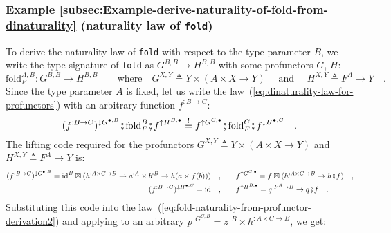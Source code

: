 \subsubsection{Example \label{subsec:Example-derive-naturality-of-fold-from-dinaturality}\ref{subsec:Example-derive-naturality-of-fold-from-dinaturality}
(naturality law of \lstinline!fold!)}

To derive the naturality law of \lstinline!fold! with respect to
the type parameter $B$, we write the type signature of \lstinline!fold!
as $G^{B,B}\rightarrow H^{B,B}$ with some profunctors $G$, $H$:
\[
\text{fold}_{F}^{A,B}:G^{B,B}\rightarrow H^{B,B}\quad\quad\text{where}\quad G^{X,Y}\triangleq Y\times(A\times X\rightarrow Y)\quad\text{ and }\quad H^{X,Y}\triangleq F^{A}\rightarrow Y\quad.
\]
Since the type parameter $A$ is fixed, let us write the law~(\ref{eq:dinaturality-law-for-profunctors})
with an arbitrary function $f^{:B\rightarrow C}$:
\begin{equation}
(f^{:B\rightarrow C})^{\downarrow G^{\bullet,B}}\bef\text{fold}_{F}^{B}\bef f^{\uparrow H^{B,\bullet}}\overset{!}{=}f^{\uparrow G^{C,\bullet}}\bef\text{fold}_{F}^{C}\bef f^{\downarrow H^{\bullet,C}}\quad.\label{eq:fold-naturality-from-profunctor-derivation2}
\end{equation}
The lifting code required for the profunctors $G^{X,Y}\triangleq Y\times\left(A\times X\rightarrow Y\right)$
and $H^{X,Y}\triangleq F^{A}\rightarrow Y$ is:
\begin{align*}
(f^{:B\rightarrow C})^{\downarrow G^{\bullet,B}}=\text{id}^{B}\boxtimes(h^{:A\times C\rightarrow B}\rightarrow a^{:A}\times b^{:B}\rightarrow h(a\times f(b)))\quad, & \quad\quad f^{\uparrow G^{C,\bullet}}=f\boxtimes(h^{:A\times C\rightarrow B}\rightarrow h\bef f)\quad,\\
(f^{:B\rightarrow C})^{\downarrow H^{\bullet,C}}=\text{id}\quad, & \quad\quad f^{\uparrow H^{B,\bullet}}=q^{:F^{A}\rightarrow B}\rightarrow q\bef f\quad.
\end{align*}
Substituting this code into the law~(\ref{eq:fold-naturality-from-profunctor-derivation2})
and applying to an arbitrary $p^{:G^{C,B}}=z^{:B}\times h^{:A\times C\rightarrow B}$,
we get:
